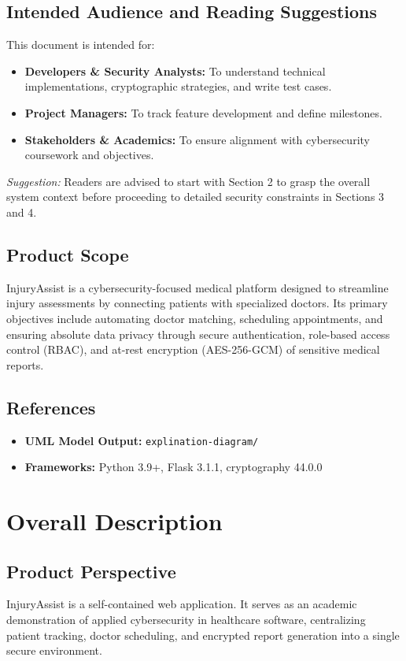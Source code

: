 \documentclass[11pt,a4paper]{article}
\begin{document}
\subsection{Intended Audience and Reading Suggestions}
This document is intended for:
\begin{itemize}
    \item \textbf{Developers \& Security Analysts:} To understand technical implementations, cryptographic strategies, and write test cases.
    \item \textbf{Project Managers:} To track feature development and define milestones.
    \item \textbf{Stakeholders \& Academics:} To ensure alignment with cybersecurity coursework and objectives.
\end{itemize}
\textit{Suggestion:} Readers are advised to start with Section 2 to grasp the overall system context before proceeding to detailed security constraints in Sections 3 and 4.

\subsection{Product Scope}
InjuryAssist is a cybersecurity-focused medical platform designed to streamline injury assessments by connecting patients with specialized doctors. Its primary objectives include automating doctor matching, scheduling appointments, and ensuring absolute data privacy through secure authentication, role-based access control (RBAC), and at-rest encryption (AES-256-GCM) of sensitive medical reports.

\subsection{References}
\begin{itemize}
    \item \textbf{UML Model Output:} \texttt{explination-diagram/}
    \item \textbf{Frameworks:} Python 3.9+, Flask 3.1.1, cryptography 44.0.0
\end{itemize}

\section{Overall Description}

\subsection{Product Perspective}
InjuryAssist is a self-contained web application. It serves as an academic demonstration of applied cybersecurity in healthcare software, centralizing patient tracking, doctor scheduling, and encrypted report generation into a single secure environment.
\end{document}
